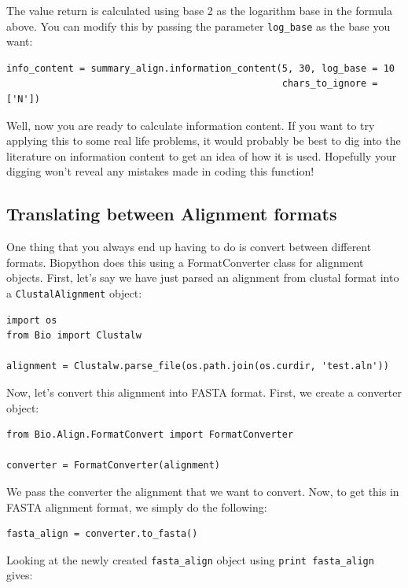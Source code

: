 \documentclass{report}
\begin{document}
The value return is calculated using base 2 as the logarithm base in the formula above. You can modify this by passing the parameter \verb|log_base| as the base you want:

\begin{verbatim}
info_content = summary_align.information_content(5, 30, log_base = 10
                                                 chars_to_ignore = ['N'])
\end{verbatim}

Well, now you are ready to calculate information content. If you want to try applying this to some real life problems, it would probably be best to dig into the literature on information content to get an idea of how it is used. Hopefully your digging won't reveal any mistakes made in coding this function!

\subsection{Translating between Alignment formats}
\label{sec:align_translate}

One thing that you always end up having to do is convert between different formats. Biopython does this using a FormatConverter class for alignment objects. First, let's say we have just parsed an alignment from clustal format into a \verb|ClustalAlignment| object:

\begin{verbatim}
import os
from Bio import Clustalw

alignment = Clustalw.parse_file(os.path.join(os.curdir, 'test.aln'))
\end{verbatim}

Now, let's convert this alignment into FASTA format. First, we create a converter object:

\begin{verbatim}
from Bio.Align.FormatConvert import FormatConverter

converter = FormatConverter(alignment)
\end{verbatim}

We pass the converter the alignment that we want to convert. Now, to get this in FASTA alignment format, we simply do the following:

\begin{verbatim}
fasta_align = converter.to_fasta()
\end{verbatim}

Looking at the newly created \verb|fasta_align| object using \verb|print fasta_align| gives:
\end{document}

